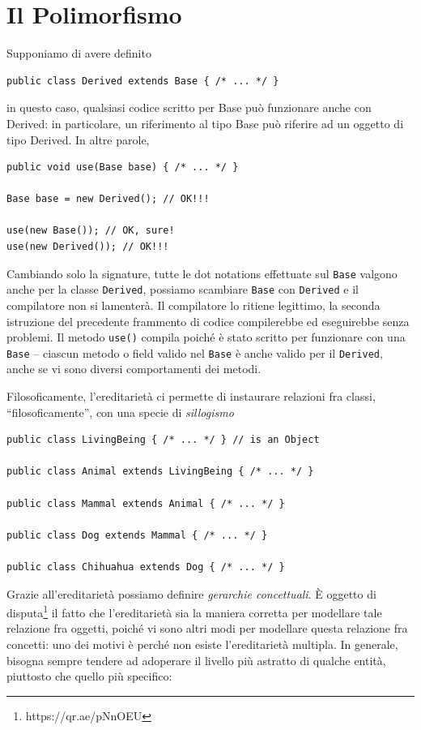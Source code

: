 \documentclass[\fontsizeclass,twocolumn]{\classname}
\theoremstyle{definition}
\theoremstyle{definition}
\begin{document}
\chapter{Il Polimorfismo}

Supponiamo di avere definito

\begin{lstlisting}
public class Derived extends Base { /* ... */ }
\end{lstlisting}

in questo caso, qualsiasi codice scritto per Base può funzionare anche con
Derived: in particolare, un riferimento al tipo Base può riferire ad un oggetto
di tipo Derived. In altre parole,

\begin{lstlisting}
public void use(Base base) { /* ... */ }

Base base = new Derived(); // OK!!!

use(new Base()); // OK, sure!
use(new Derived()); // OK!!!
\end{lstlisting}

Cambiando solo la signature, tutte le dot notations effettuate sul \texttt{Base} valgono
anche per la classe \texttt{Derived}, possiamo scambiare \texttt{Base} con \texttt{Derived} e il
compilatore non si lamenterà. Il compilatore lo ritiene legittimo, la
seconda istruzione del precedente frammento di codice compilerebbe ed
eseguirebbe senza problemi. Il metodo \texttt{use()} compila poiché è stato
scritto per funzionare con una \texttt{Base} \--- ciascun metodo o field valido nel \texttt{Base}
è anche valido per il \texttt{Derived}, anche se vi sono diversi comportamenti dei
metodi.

Filosoficamente, l'ereditarietà ci permette di instaurare relazioni fra classi,
``filosoficamente'', con una specie di \emph{sillogismo}

\begin{lstlisting}
public class LivingBeing { /* ... */ } // is an Object

public class Animal extends LivingBeing { /* ... */ }

public class Mammal extends Animal { /* ... */ }

public class Dog extends Mammal { /* ... */ }

public class Chihuahua extends Dog { /* ... */ }
\end{lstlisting}

Grazie all'ereditarietà possiamo definire \emph{gerarchie concettuali}. È
oggetto di disputa\footnote{https://qr.ae/pNnOEU} il fatto che l'ereditarietà sia la
maniera corretta per modellare tale relazione fra oggetti, poiché vi sono altri
modi per modellare questa relazione fra concetti: uno dei motivi è perché non
esiste l'ereditarietà multipla. In generale, bisogna sempre tendere ad adoperare
il livello più astratto di qualche entità, piuttosto che quello più specifico:
\end{document}
